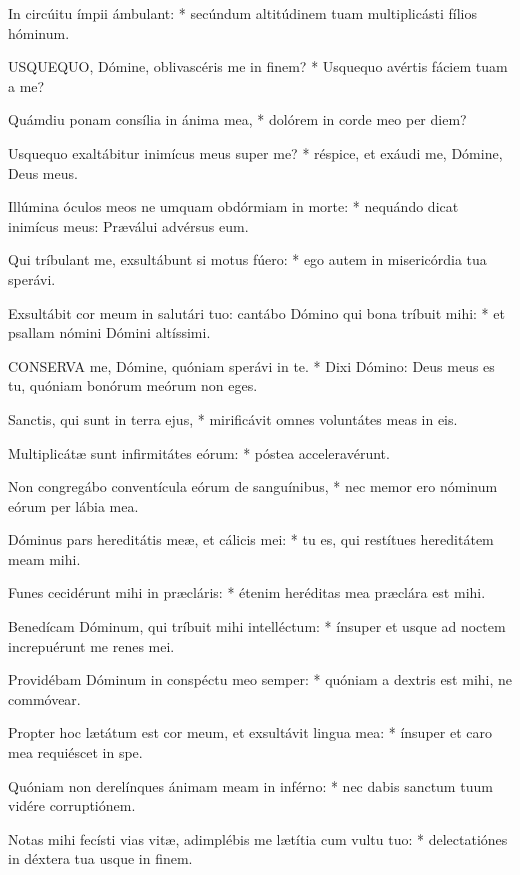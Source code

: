 In circúitu ímpii ámbulant: * secúndum altitúdinem tuam multiplicásti fílios hóminum.


\lettrine[lines=2]{U}{SQUEQUO}, Dómine, oblivascéris me in finem? * Usquequo avértis fáciem tuam a me?

Quámdiu ponam consília in ánima mea, * dolórem in corde meo per diem?

Usquequo exaltábitur inimícus meus super me? * réspice, et exáudi me, Dómine, Deus meus.

Illúmina óculos meos ne umquam obdórmiam in morte: * nequándo dicat inimícus meus: Præválui advérsus eum.

Qui tríbulant me, exsultábunt si motus fúero: * ego autem in misericórdia tua sperávi.

Exsultábit cor meum in salutári tuo: cantábo Dómino qui bona tríbuit mihi: * et psallam nómini Dómini altíssimi.


\lettrine[lines=2]{C}{ONSERVA} me, Dómine, quóniam sperávi in te. * Dixi Dómino: Deus meus es tu, quóniam bonórum meórum non eges.

Sanctis, qui sunt in terra ejus, * mirificávit omnes voluntátes meas in eis.

Multiplicátæ sunt infirmitátes eórum: * póstea acceleravérunt.

Non congregábo conventícula eórum de sanguínibus, * nec memor ero nóminum eórum per lábia mea.

Dóminus pars hereditátis meæ, et cálicis mei: * tu es, qui restítues hereditátem meam mihi.

Funes cecidérunt mihi in præcláris: * étenim heréditas mea præclára est mihi.

Benedícam Dóminum, qui tríbuit mihi intelléctum: * ínsuper et usque ad noctem increpuérunt me renes mei.

Providébam Dóminum in conspéctu meo semper: * quóniam a dextris est mihi, ne commóvear.

Propter hoc lætátum est cor meum, et exsultávit lingua mea: * ínsuper et caro mea requiéscet in spe.

Quóniam non derelínques ánimam meam in inférno: * nec dabis sanctum tuum vidére corruptiónem.

Notas mihi fecísti vias vitæ, adimplébis me lætítia cum vultu tuo: * delectatiónes in déxtera tua usque in finem.


